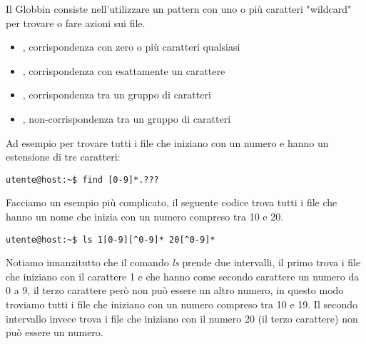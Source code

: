 \documentclass[../main.tex]{subfiles}
\begin{document}
Il Globbin consiste nell'utilizzare un pattern con uno o più caratteri "wildcard" per trovare o fare azioni sui file.
\begin{itemize}
    \item \code{*}, corrispondenza con zero o più caratteri qualsiasi
    \item {}, corrispondenza con esattamente un carattere
    \item {}, corrispondenza tra un gruppo di caratteri
    \item {}, non-corrispondenza tra un gruppo di caratteri
\end{itemize}

Ad esempio per trovare tutti i file che iniziano con un numero e hanno un estensione di tre caratteri:
\begin{lstlisting}[style=bash]
    utente@host:~$ find [0-9]*.???
\end{lstlisting}

Facciamo un esempio più complicato, il seguente codice trova tutti i file che hanno un nome che inizia con un numero compreso tra 10 e 20.
\begin{lstlisting}[style=bash]
    utente@host:~$ ls 1[0-9][^0-9]* 20[^0-9]*
\end{lstlisting}
Notiamo innanzitutto che il comando \textit{ls} prende due intervalli, il primo trova i file che iniziano con il carattere 1 e che hanno
come secondo carattere un numero da 0 a 9, il terzo carattere però non può essere un altro numero, in questo modo troviamo tutti i file
che iniziano con un numero compreso tra 10 e 19. Il secondo intervallo invece trova i file che iniziano con il numero 20 (il terzo carattere)
non può essere un numero.
\end{document}
